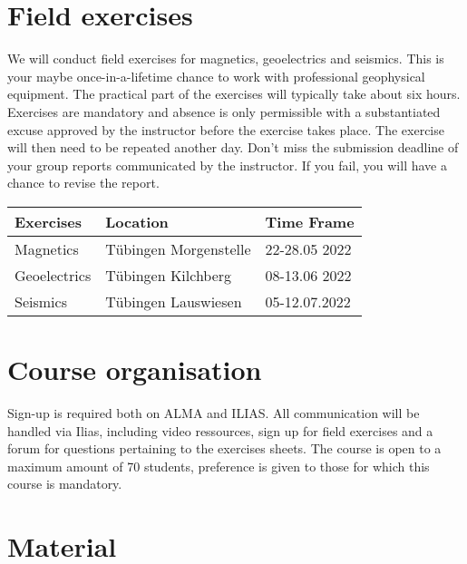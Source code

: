\documentclass[letterpaper]{inzane_syllabus} %
\begin{document}
\section{Field exercises}

We will conduct field exercises for magnetics, geoelectrics and seismics. This is your maybe once-in-a-lifetime chance to work with professional geophysical equipment. The practical part of the exercises will typically take about six hours. Exercises are mandatory and absence is only permissible with a substantiated excuse approved by the instructor before the exercise takes place. The exercise will then need to be repeated another day. Don't miss the submission deadline of your group reports communicated by the instructor. If you fail, you will have a chance to revise the report.
\begin{center}
\begin{tabular}{ p{3cm}p{5cm} p{3cm}}
 \textbf{Exercises} & Location  & Time Frame \\
 \hline
 Magnetics   & Tübingen Morgenstelle & 22-28.05 2022       \\
 Geoelectrics &  Tübingen Kilchberg & 08-13.06 2022  \\
 Seismics & Tübingen Lauswiesen & 05-12.07.2022 \\
\end{tabular}
\end{center}

\section{Course organisation}

Sign-up is required both on ALMA and ILIAS. All communication will be handled via Ilias, including video ressources, sign up for field exercises and a forum for questions pertaining to the exercises sheets. The course is open to a maximum amount of 70 students, preference is given to those for which this course is mandatory.


\newpage %

\makeSide %


\section{Material}
\end{document}
